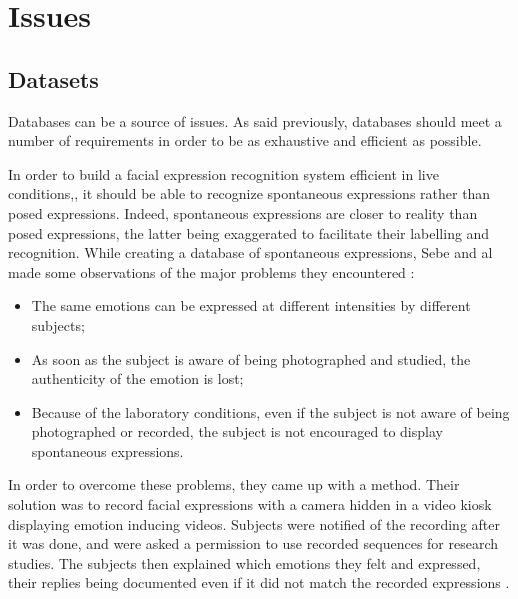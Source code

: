 \section{Issues}

\vspace{\baselineskip}
\subsection{Datasets}

\vspace{\baselineskip}
\noindent Databases can be a source of issues. As said previously, databases should meet a number of requirements in order to be as exhaustive and efficient as possible. 
\newline

\noindent In order to build a facial expression recognition system efficient in live conditions,, it should be able to recognize spontaneous expressions rather than posed expressions. Indeed, spontaneous expressions are closer to reality than posed expressions, the latter being exaggerated to facilitate their labelling and recognition. While creating a database of spontaneous expressions, Sebe and al \cite{SEB07} made some observations of the major problems they encountered \cite{BET12}:
\newline
\begin{itemize}
  \item The same emotions can be expressed at different intensities by different subjects;
  \item As soon as the subject is aware of being photographed and studied, the authenticity of the emotion is lost;
  \item Because of the laboratory conditions, even if the subject is not aware of being photographed or recorded, the subject is not encouraged to display spontaneous expressions.
\end{itemize}

\vspace{\baselineskip}
\noindent In order to overcome these problems, they came up with a method. Their solution was to record facial expressions with a camera hidden in a video kiosk displaying emotion inducing videos. Subjects were notified of the recording after it was done, and were asked a permission to use recorded sequences for research studies. The subjects then explained which emotions they felt and expressed, their replies being documented even if it did not match the recorded expressions \cite{SEB07}.
\newline


